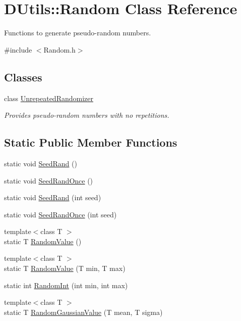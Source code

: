 \hypertarget{classDUtils_1_1Random}{}\section{D\+Utils\+:\+:Random Class Reference}
\label{classDUtils_1_1Random}


Functions to generate pseudo-\/random numbers.  




{\ttfamily \#include $<$Random.\+h$>$}

\subsection*{Classes}
\begin{DoxyCompactItemize}
\item 
class \hyperlink{classDUtils_1_1Random_1_1UnrepeatedRandomizer}{Unrepeated\+Randomizer}
\begin{DoxyCompactList}\small\item\em Provides pseudo-\/random numbers with no repetitions. \end{DoxyCompactList}\end{DoxyCompactItemize}
\subsection*{Static Public Member Functions}
\begin{DoxyCompactItemize}
\item 
static void \hyperlink{classDUtils_1_1Random_a719a6489316343a771e062f0be58050f}{Seed\+Rand} ()
\item 
static void \hyperlink{classDUtils_1_1Random_a168e77d82ce1e66c6759e97ef27adbbc}{Seed\+Rand\+Once} ()
\item 
static void \hyperlink{classDUtils_1_1Random_aec19d58856a0cf0b48d783119a497233}{Seed\+Rand} (int seed)
\item 
static void \hyperlink{classDUtils_1_1Random_ad3652f5d105ca4f6f22696b64f2a4a5d}{Seed\+Rand\+Once} (int seed)
\item 
{\footnotesize template$<$class T $>$ }\\static T \hyperlink{classDUtils_1_1Random_ac5d2e4d977afdec30071c531a7a96d88}{Random\+Value} ()
\item 
{\footnotesize template$<$class T $>$ }\\static T \hyperlink{classDUtils_1_1Random_a13760f5d6d4b866fbcc350dbb0d39d02}{Random\+Value} (T min, T max)
\item 
static int \hyperlink{classDUtils_1_1Random_aa25012101ecbca54025d5430bcf93d86}{Random\+Int} (int min, int max)
\item 
{\footnotesize template$<$class T $>$ }\\static T \hyperlink{classDUtils_1_1Random_a2c769bcd60a08fc3eba3ef4abf9761d5}{Random\+Gaussian\+Value} (T mean, T sigma)
\end{DoxyCompactItemize}



